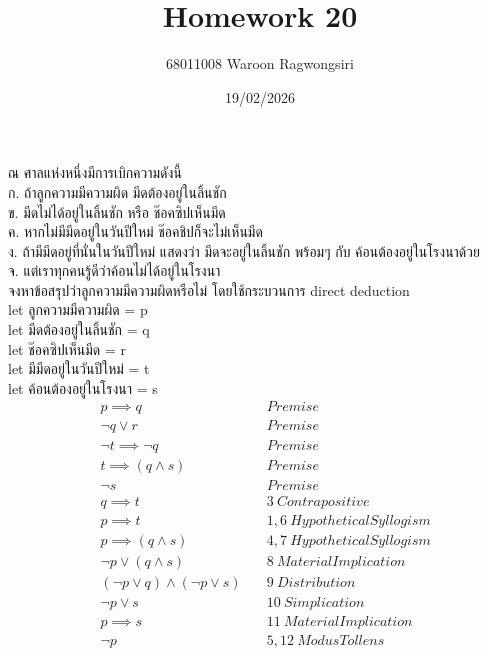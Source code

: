 \documentclass{article}
\title{Homework 20}
\author{68011008 Waroon Ragwongsiri}
\date{19/02/2026}
\begin{document}
\maketitle

{\small
ณ ศาลแห่งหนึ่งมีการเบิกความดังนี้ \\
ก. ถ้าลูกความมีความผิด มีดต้องอยู่ในลิ้นชัก \\
ข. มีดไม่ได้อยู่ในลิ้นชัก หรือ ช๊อคซิปเห็นมีด \\
ค. หากไม่มีมีดอยู่ในวันปีใหม่ ช๊อคชิปก็จะไม่เห็นมีด \\
ง. ถ้ามีมีดอยู่ที่นั่นในวันปีใหม่ แสดงว่า มีดจะอยู่ในลิ้นชัก พร้อมๆ กับ ค้อนต้องอยู่ในโรงนาด้วย \\
จ. แต่เราทุกคนรู้ดีว่าค้อนไม่ได้อยู่ในโรงนา \\
จงหาข้อสรุปว่าลูกความมีความผิดหรือไม่ โดยใช้กระบวนการ direct deduction \\
let ลูกความมีความผิด = p \\
let มีดต้องอยู่ในลิ้นชัก = q \\
let ช๊อคซิปเห็นมีด = r \\
let มีมีดอยู่ในวันปีใหม่ = t \\
let ค้อนต้องอยู่ในโรงนา = s
}
\begin{align}
	&p \implies q \quad & Premise \\
	&\neg q \lor r \quad & Premise \\
	&\neg t \implies \neg q \quad & Premise \\
	&t \implies (q \land s) \quad & Premise \\
	&\neg s \quad & Premise \\
	&q \implies t \quad & 3 \ Contrapositive \\
	&p \implies t \quad & 1,6 \ Hypothetical Syllogism \\
	&p \implies (q \land s) \quad & 4,7 \ Hypothetical Syllogism \\
	&\neg p \lor (q \land s) \quad & 8 \ Material Implication \\
	&(\neg p \lor q) \land (\neg p \lor s) \quad & 9 \ Distribution \\
	&\neg p \lor s \quad & 10 \ Simplication \\
	&p \implies s \quad & 11 \ Material Implication \\
	&\neg p \quad & 5,12 \ Modus Tollens
\end{align}
\small
{
}
\end{document}
